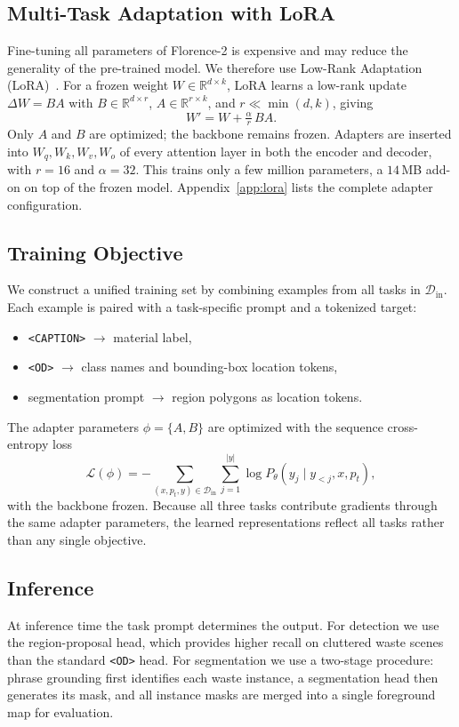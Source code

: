 \documentclass[conference]{IEEEtran}
\begin{document}
\subsection{Multi-Task Adaptation with LoRA}
Fine-tuning all parameters of Florence-2 is expensive and may reduce the generality
of the pre-trained model. We therefore use Low-Rank Adaptation
(LoRA)~\cite{lora}. For a frozen weight $W\in\mathbb{R}^{d\times k}$, LoRA learns
a low-rank update $\Delta W=BA$ with $B\in\mathbb{R}^{d\times r}$,
$A\in\mathbb{R}^{r\times k}$, and $r\ll\min(d,k)$, giving
\begin{equation}
W' = W + \tfrac{\alpha}{r}\,BA .
\label{eq:lora}
\end{equation}
Only $A$ and $B$ are optimized; the backbone remains frozen. Adapters are inserted
into $W_q,W_k,W_v,W_o$ of every attention layer in both the encoder and decoder,
with $r{=}16$ and $\alpha{=}32$. This trains only a few million parameters, a
$14$\,MB add-on on top of the frozen model. Appendix~\ref{app:lora} lists the
complete adapter configuration.

\subsection{Training Objective}
We construct a unified training set by combining examples from all tasks in
$\mathcal{D}_{\text{in}}$. Each example is paired with a task-specific prompt and
a tokenized target:
\begin{itemize}
\item \texttt{<CAPTION>} $\to$ material label,
\item \texttt{<OD>} $\to$ class names and bounding-box location tokens,
\item segmentation prompt $\to$ region polygons as location tokens.
\end{itemize}
The adapter parameters $\phi=\{A,B\}$ are optimized with the sequence
cross-entropy loss
\begin{equation}
\mathcal{L}(\phi) = -\!\!\sum_{(x,p_t,y)\in\mathcal{D}_{\text{in}}}\sum_{j=1}^{|y|}
\log P_\theta\!\left(y_j \mid y_{<j}, x, p_t\right),
\label{eq:loss}
\end{equation}
with the backbone frozen. Because all three tasks contribute gradients through the
same adapter parameters, the learned representations reflect all tasks rather than
any single objective.

\subsection{Inference}
At inference time the task prompt determines the output. For detection we use the
region-proposal head, which provides higher recall on cluttered waste scenes than
the standard \texttt{<OD>} head. For segmentation we use a two-stage procedure:
phrase grounding first identifies each waste instance, a segmentation head then
generates its mask, and all instance masks are merged into a single foreground map
for evaluation.
\end{document}
